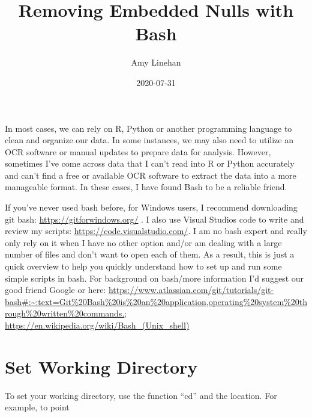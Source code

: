 \documentclass[]{article}
\title{Removing Embedded Nulls with Bash}
\author{Amy Linehan}
\date{2020-07-31}
\begin{document}
\maketitle

In most cases, we can rely on R, Python or another programming language
to clean and organize our data. In some instances, we may also need to
utilize an OCR software or manual updates to prepare data for analysis.
However, sometimes I've come across data that I can't read into R or
Python accurately and can't find a free or available OCR software to
extract the data into a more manageable format. In these cases, I have
found Bash to be a reliable friend.

If you've never used bash before, for Windows users, I recommend
downloading git bash: \url{https://gitforwindows.org/} . I also use
Visual Studios code to write and review my scripts:
\url{https://code.visualstudio.com/}. I am no bash expert and really
only rely on it when I have no other option and/or am dealing with a
large number of files and don't want to open each of them. As a result,
this is just a quick overview to help you quickly understand how to set
up and run some simple scripts in bash. For background on bash/more
information I'd suggest our good friend Google or here:
\url{https://www.atlassian.com/git/tutorials/git-bash\#:~:text=Git\%20Bash\%20is\%20an\%20application,operating\%20system\%20through\%20written\%20commands.};
\url{https://en.wikipedia.org/wiki/Bash_(Unix_shell)}

\hypertarget{set-working-directory}{%
\section{Set Working Directory}\label{set-working-directory}}

To set your working directory, use the function ``cd'' and the location.
For example, to point
\end{document}
